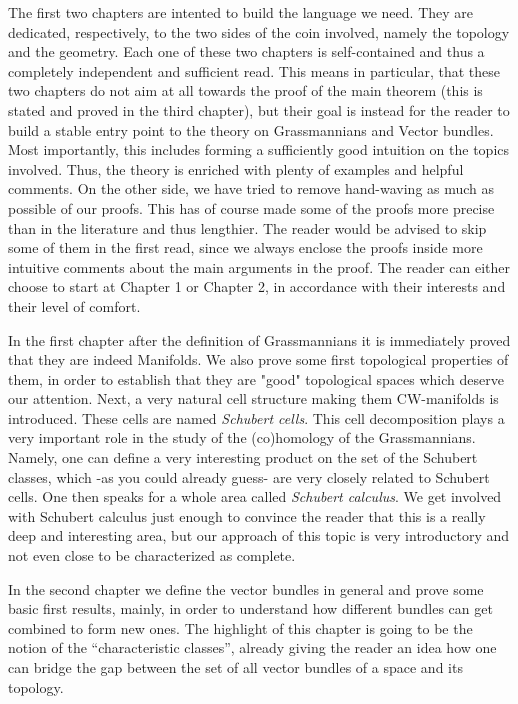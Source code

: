 The first two chapters are intented to build the language we need. They are dedicated, respectively, to the two sides of the coin involved, namely the topology and the geometry. Each one of these two chapters is self-contained and thus a completely independent and sufficient read. This means in particular, that these two chapters do not aim at all towards the proof of the main theorem (this is stated and proved in the third chapter), but their goal is instead for the reader to build a stable entry point to the theory on Grassmannians and Vector bundles. Most importantly, this includes forming a sufficiently good intuition on the topics involved. Thus, the theory is enriched with plenty of examples and helpful comments. On the other side, we have tried to remove hand-waving as much as possible of our proofs. This has of course made some of the proofs more precise than in the literature and thus lengthier. The reader would be advised to skip some of them in the first read, since we always enclose the proofs inside more intuitive comments about the main arguments in the proof.
The reader can either choose to start at Chapter 1 or Chapter 2, in accordance with their interests and their level of comfort.

In the first chapter after the definition of Grassmannians it is immediately proved that they are indeed Manifolds. We also prove some first topological properties of them, in order to establish that they are "good" topological spaces which deserve our attention. Next, a very natural cell structure making them CW-manifolds is introduced. These cells are named \emph{Schubert cells}. This cell decomposition plays a very important role in the study of the (co)homology of the Grassmannians. Namely, one can define a very interesting product on the set of the Schubert classes, which -as you could already guess- are very closely related to Schubert cells. One then speaks for a whole area called \emph{Schubert calculus}. We get involved with Schubert calculus just enough to convince the reader that this is a really deep and interesting area, but our approach of this topic is very introductory and not even close to be characterized as complete.

In the second chapter we define the vector bundles in general and prove some basic first results, mainly, in order to understand how different bundles can get combined to form new ones. The highlight of this chapter is going to be the notion of the ``characteristic classes'', already giving the reader an idea how one can bridge the gap between the set of all vector bundles of a space and its topology.


